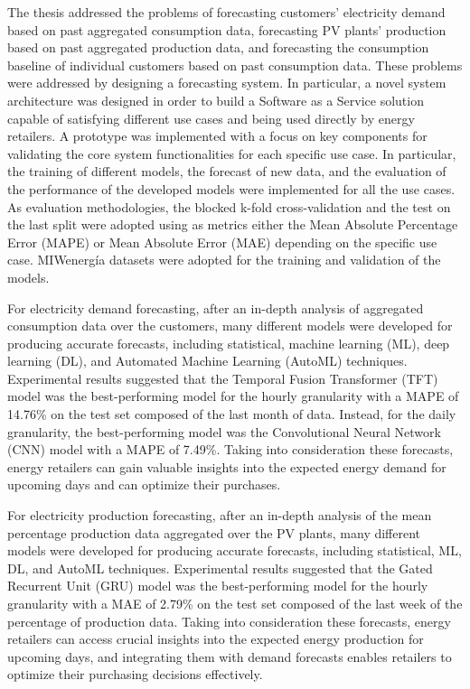 The thesis addressed the problems of forecasting customers' electricity demand based on past aggregated consumption data, forecasting PV plants' production based on past aggregated production data, and forecasting the consumption baseline of individual customers based on past consumption data.
These problems were addressed by designing a forecasting system.
In particular, a novel system architecture was designed in order to build a Software as a Service solution capable of satisfying different use cases and being used directly by energy retailers.
A prototype was implemented with a focus on key components for validating the core system functionalities for each specific use case.
In particular, the training of different models, the forecast of new data, and the evaluation of the performance of the developed models were implemented for all the use cases.
As evaluation methodologies, the blocked k-fold cross-validation and the test on the last split were adopted using as metrics either the Mean Absolute Percentage Error (MAPE) or Mean Absolute Error (MAE) depending on the specific use case.
MIWenergía datasets were adopted for the training and validation of the models.

For electricity demand forecasting, after an in-depth analysis of aggregated consumption data over the customers, many different models were developed for producing accurate forecasts, including statistical, machine learning (ML), deep learning (DL), and Automated Machine Learning (AutoML) techniques.
Experimental results suggested that the Temporal Fusion Transformer (TFT) model was the best-performing model for the hourly granularity with a MAPE of 14.76\% on the test set composed of the last month of data.
Instead, for the daily granularity, the best-performing model was the Convolutional Neural Network (CNN) model with a MAPE of 7.49\%.
Taking into consideration these forecasts, energy retailers can gain valuable insights into the expected energy demand for upcoming days and can optimize their purchases.

For electricity production forecasting, after an in-depth analysis of the mean percentage production data aggregated over the PV plants, many different models were developed for producing accurate forecasts, including statistical, ML, DL, and AutoML techniques.
Experimental results suggested that the Gated Recurrent Unit (GRU) model was the best-performing model for the hourly granularity with a MAE of 2.79\% on the test set composed of the last week of the percentage of production data.
Taking into consideration these forecasts, energy retailers can access crucial insights into the expected energy production for upcoming days, and integrating them with demand forecasts enables retailers to optimize their purchasing decisions effectively.

